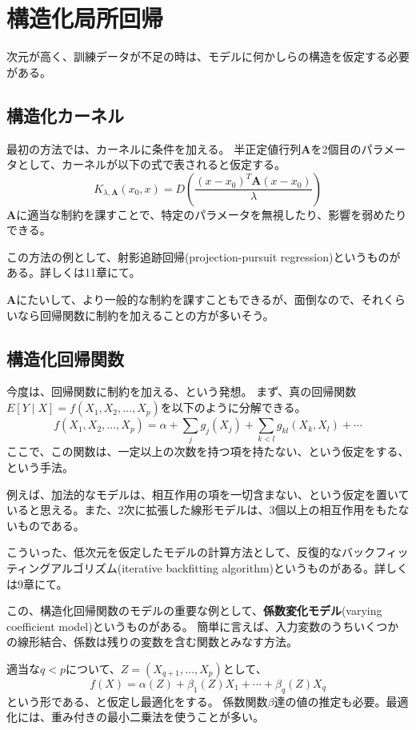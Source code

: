 \documentclass{jsarticle}
\begin{document}
\section{構造化局所回帰}
次元が高く、訓練データが不足の時は、モデルに何かしらの構造を仮定する必要がある。
\subsection{構造化カーネル}
最初の方法では、カーネルに条件を加える。
半正定値行列$\mathbf{A}$を2個目のパラメータとして、カーネルが以下の式で表されると仮定する。
\[
  K_{\lambda,\mathbf{A}}(x_{0},x)=D \left ( \frac{(x-x_{0})^{T}\mathbf{A}(x-x_{0})}{\lambda} \right )
\]
$\mathbf{A}$に適当な制約を課すことで、特定のパラメータを無視したり、影響を弱めたりできる。

この方法の例として、射影追跡回帰(projection-pursuit regression)というものがある。詳しくは11章にて。

$\mathbf{A}$にたいして、より一般的な制約を課すこともできるが、面倒なので、それくらいなら回帰関数に制約を加えることの方が多いそう。

\subsection{構造化回帰関数}
今度は、回帰関数に制約を加える、という発想。
まず、真の回帰関数$E[Y \mid X]=f(X_{1},X_{2}, \dots ,X_{p})$を以下のように分解できる。
\[
  f(X_{1},X_{2}, \dots ,X_{p})=\alpha + \sum_{j}g_{j}(X_{j}) + \sum_{k<l}g_{kl}(X_{k},X_{l}) + \cdots
\]
ここで、この関数は、一定以上の次数を持つ項を持たない、という仮定をする、という手法。

例えば、加法的なモデルは、相互作用の項を一切含まない、という仮定を置いていると思える。また、2次に拡張した線形モデルは、3個以上の相互作用をもたないものである。

こういった、低次元を仮定したモデルの計算方法として、反復的なバックフィッティングアルゴリズム(iterative backfitting algorithm)というものがある。詳しくは9章にて。

この、構造化回帰関数のモデルの重要な例として、\textbf{係数変化モデル}(varying coefficient model)というものがある。
簡単に言えば、入力変数のうちいくつかの線形結合、係数は残りの変数を含む関数とみなす方法。

適当な$q<p$について、$Z=(X_{q+1},\dots,X_{p})$として、
\[
  f(X)=\alpha(Z)+\beta_{1}(Z)X_{1}+\cdots+\beta_{q}(Z)X_{q}
\]
という形である、と仮定し最適化をする。
係数関数$\beta$達の値の推定も必要。最適化には、重み付きの最小二乗法を使うことが多い。
\end{document}
